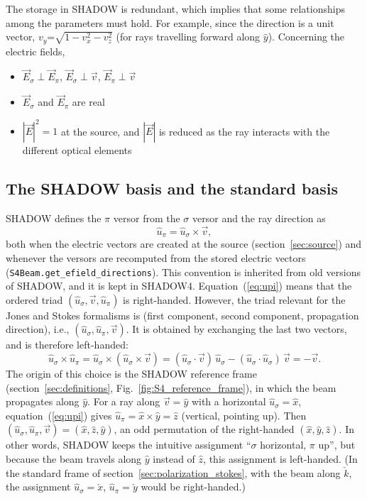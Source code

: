 \documentclass{iucr}
\begin{document}
The storage in SHADOW is redundant, which implies that some relationships among the parameters must hold. For example, since the direction is a unit vector, $v_y\text{=}\sqrt{1-v_x^2-v_z^2}$ (for rays travelling forward along $\hat{y}$). Concerning the electric fields,
\begin{itemize}
 \item $\vec{E}_\sigma \perp \vec{E}_\pi$, $\vec{E}_\sigma \perp \vec{v}$, $\vec{E}_\pi \perp \vec{v}$
 \item $\vec{E}_\sigma$ and $\vec{E}_\pi$ are real
 \item $|\vec{E}|^2=1$ at the source, and $|\vec{E}|$ is reduced as the ray interacts with the different
 optical elements
\end{itemize}

\subsection{The SHADOW basis and the standard basis}\label{sec:handedness}
SHADOW defines the $\pi$ versor from the $\sigma$ versor and the ray direction as
\begin{equation}\label{eq:upi}
  \hat{u}_\pi = \hat{u}_\sigma \times \vec{v},
\end{equation}
both when the electric vectors are created at the source (section~\ref{sec:source}) and whenever the versors are recomputed from the stored electric vectors ({\tt S4Beam.get\_efield\_directions}). This convention is inherited from old versions of SHADOW, and it is kept in SHADOW4.
Equation~(\ref{eq:upi}) means that the ordered triad $(\hat{u}_\sigma, \vec{v}, \hat{u}_\pi)$ is right-handed. However, the triad relevant for the Jones and Stokes formalisms is (first component, second component, propagation direction), i.e., $(\hat{u}_\sigma, \hat{u}_\pi, \vec{v})$. It is obtained by exchanging the last two vectors, and is therefore left-handed:
\begin{equation}\label{eq:lefthanded}
  \hat{u}_\sigma \times \hat{u}_\pi
  = \hat{u}_\sigma \times (\hat{u}_\sigma \times \vec{v})
  = (\hat{u}_\sigma\cdot\vec{v})\,\hat{u}_\sigma - (\hat{u}_\sigma\cdot\hat{u}_\sigma)\,\vec{v}
  = -\vec{v}.
\end{equation}
The origin of this choice is the SHADOW reference frame (section~\ref{sec:definitions}, Fig.~\ref{fig:S4_reference_frame}), in which the beam propagates along $\hat{y}$. For a ray along $\vec{v}=\hat{y}$ with a horizontal $\hat{u}_\sigma=\hat{x}$, equation~(\ref{eq:upi}) gives $\hat{u}_\pi=\hat{x}\times\hat{y}=\hat{z}$ (vertical, pointing up). Then $(\hat{u}_\sigma,\hat{u}_\pi,\vec{v})=(\hat{x},\hat{z},\hat{y})$, an odd permutation of the right-handed $(\hat{x},\hat{y},\hat{z})$. In other words, SHADOW keeps the intuitive assignment ``$\sigma$ horizontal, $\pi$ up'', but because the beam travels along $\hat{y}$ instead of $\hat{z}$, this assignment is left-handed. (In the standard frame of section~\ref{sec:polarization_stokes}, with the beam along $\check{k}$, the assignment $\hat{u}_\sigma=\check{x}$, $\hat{u}_\pi=\check{y}$ would be right-handed.)
\end{document}
